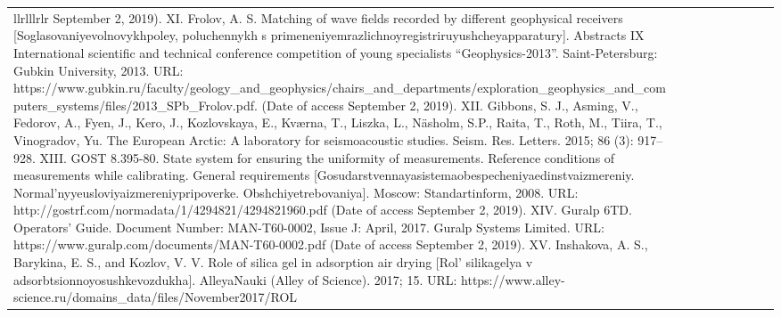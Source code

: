 \begin{longtable}{lllllllll}{llrlllrlr}
September 2, 2019).  XI. Frolov, A. S. Matching of wave fields recorded by different geophysical receivers [Soglasovaniyevolnovykhpoley, poluchennykh s primeneniyemrazlichnoyregistriruyushcheyapparatury]. Abstracts IX International scientific and technical conference competition of young specialists “Geophysics-2013”. Saint-Petersburg: Gubkin University, 2013. URL: https://www.gubkin.ru/faculty/geology_and_geophysics/chairs_and_departments/exploration_geophysics_and_computers_systems/files/2013_SPb_Frolov.pdf. (Date of access September 2, 2019).  XII. Gibbons, S. J., Asming, V., Fedorov, A., Fyen, J., Kero, J., Kozlovskaya, E., Kværna, T., Liszka, L., Näsholm, S.P., Raita, T., Roth, M., Tiira, T., Vinogradov, Yu. The European Arctic: A laboratory for seismoacoustic studies. Seism. Res. Letters. 2015; 86 (3): 917–928.  XIII. GOST 8.395-80. State system for ensuring the uniformity of measurements. Reference conditions of measurements while calibrating. General requirements [Gosudarstvennayasistemaobespecheniyaedinstvaizmereniy. Normal’nyyeusloviyaizmereniypripoverke. Obshchiyetrebovaniya]. Moscow: Standartinform, 2008. URL: http://gostrf.com/normadata/1/4294821/4294821960.pdf (Date of access September 2, 2019).  XIV. Guralp 6TD. Operators’ Guide. Document Number: MAN-T60-0002, Issue J: April, 2017. Guralp Systems Limited. URL: https://www.guralp.com/documents/MAN-T60-0002.pdf (Date of access September 2, 2019). XV. Inshakova, A. S., Barykina, E. S., and Kozlov, V. V. Role of silica gel in adsorption air drying [Rol’ silikagelya v adsorbtsionnoyosushkevozdukha]. AlleyaNauki (Alley of Science). 2017; 15. URL: https://www.alley- science.ru/domains_data/files/November2017/ROL%
\end{longtable}
